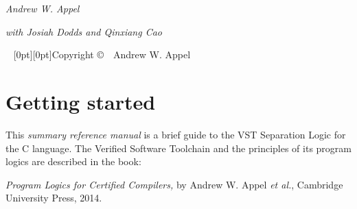 \documentclass[12pt,fleqn,openany,oneside,showtrims]{memoir}
\begin{document}
\frontmatter
{}
\thispagestyle{empty}%
{
\centering
  \vspace*{4pc}%
  \fontsize{48}{48}\selectfont\par{}%

\vskip50pt
  \fontsize{20}{30}\selectfont\par{}%

\vskip50pt
  \fontsize{14}{16}\selectfont\par{}
\vskip100pt
\par
\vskip10pt
{\fontsize{24}{30}\selectfont\par\noindent%
{\itshape Andrew W. Appel}}\par
\vskip10pt
{\fontsize{16}{19}\selectfont\par\noindent%
{\centering \itshape with Josiah Dodds and Qinxiang Cao\\}}
}

~\vfill
\setlength{\parindent}{0pt}
\setlength{\parskip}{\baselineskip}
\clearpage
\raisebox{-7in}[0pt][0pt]{Copyright \copyright\ \the\year\ Andrew W. Appel}

\tableofcontents  %

\clearpage
\savepagenumber
\mainmatter
\restorepagenumber
\renewcommand{\chaptermark}[1]{\markboth{\thechapter.~#1\hfill{\textcolor{red}\thefile}\hspace*{2em}}{}}

\chapter{Getting started}

This \emph{summary reference manual}
is a brief guide to the
VST Separation Logic for the C language.
The Verified Software Toolchain and
the principles of its program logics
are described in the book:

\noindent \emph{\large Program Logics for Certified Compilers,}\newline
by Andrew W. Appel \emph{et al.},
Cambridge University Press, 2014.
\vspace{-2ex}
\end{document}
